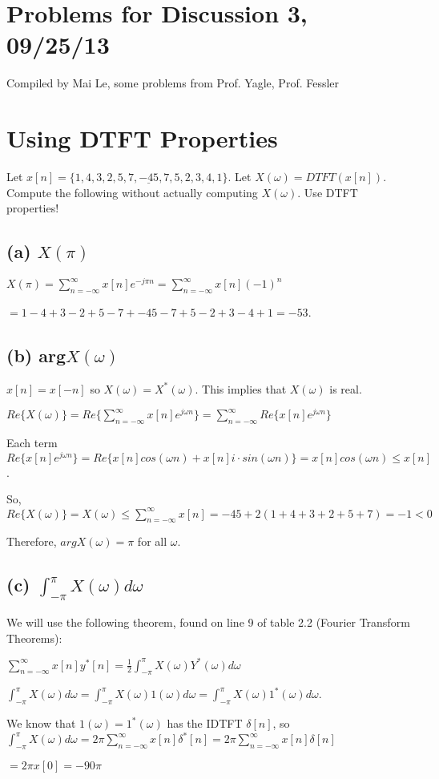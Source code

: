 \documentclass[11pt]{article}
\begin{document}
\section*{Problems for Discussion 3, 09/25/13}
Compiled by Mai Le, some problems from Prof. Yagle, Prof. Fessler

\section{Using DTFT Properties}

Let $x[n] = \{1,4,3,2,5,7,\underline{-45},7,5,2,3,4,1\}$. Let $X(\omega)=DTFT(x[n])$. Compute the following without actually computing $X(\omega)$. Use DTFT properties!

\subsection{(a) $X(\pi)$}

{\color{blue}
$X(\pi)=\sum\limits_{n=-\infty}^\infty x[n]e^{-j\pi n} = \sum\limits_{n=-\infty}^\infty x[n](-1)^n$

$ = 1-4+3-2+5-7+-45-7+5-2+3-4+1 = -53$.
}

\subsection{(b) arg$X(\omega)$}

{\color{blue}
$x[n] = x[-n]$ so $X(\omega) = X^*(\omega)$. This implies that $X(\omega)$ is real.

$Re\{X(\omega)\} = Re\{\sum_{n=-\infty}^\infty x[n] e^{j \omega n} \} = \sum_{n=-\infty}^\infty Re\{x[n] e^{j \omega n} \}$

Each term $ Re\{x[n] e^{j \omega n} \} = Re\{x[n] cos(\omega n) + x[n] i\cdot sin(\omega n) \} = x[n] cos (\omega n) \leq x[n] $.

So, $Re\{X(\omega)\} = X(\omega) \leq \sum_{n=-\infty}^\infty x[n] = -45+2(1+4+3+2+5+7) = -1 < 0$

Therefore, $argX(\omega) = \pi$ for all $\omega$.

}

\subsection{(c) $\int_{-\pi}^\pi X(\omega) d\omega$}

{\color{blue}
We will use the following theorem, found on line 9 of table 2.2 (Fourier Transform Theorems):

$\sum\limits_{n=-\infty}^\infty x[n]y^*[n] = \frac{1}{2}\int_{-\pi}^\pi X(\omega)Y^*(\omega)d\omega $

$\int_{-\pi}^\pi X(\omega) d\omega = \int_{-\pi}^\pi X(\omega) 1(\omega) d\omega = \int_{-\pi}^\pi X(\omega) 1^*(\omega) d\omega$.

We know that $1(\omega)=1^*(\omega)$ has the IDTFT $\delta[n]$, so $\int_{-\pi}^\pi X(\omega) d\omega = 2\pi \sum\limits_{n=-\infty}^\infty x[n]\delta^*[n] = 2\pi \sum\limits_{n=-\infty}^\infty x[n]\delta[n]$

$=2 \pi x[0] = -90 \pi$

}
\end{document}
